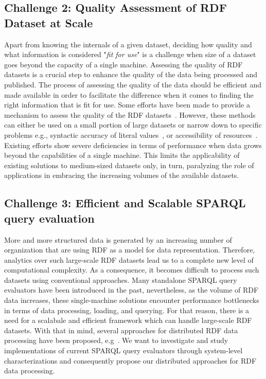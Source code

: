 \subsection{Challenge 2: Quality Assessment of RDF Dataset at Scale}
\label{sec:c2}
Apart from knowing the internals of a given dataset, deciding how quality and what information is considered "\textit{fit for use}" is a challenge when size of a dataset goes beyond the capacity of a single machine.
Assessing the quality of \gls{RDF} datasets is a crucial step to enhance the quality of the data being processed and published.
The process of assessing the quality of the data should be efficient and made available in order to facilitate the difference when it comes to finding the right information that is fit for use.
Some efforts have been made to provide a mechanism to assess the quality of the \gls{RDF} datasets~\cite{Debattista0AC18,farber2018,beek2018,debattista2016luzzu}.
However, these methods can either be used on a small portion of large datasets \cite{farber2018} or narrow down to specific problems e.g., syntactic accuracy of literal values~\cite{beek2018}, or accessibility of resources~\cite{Mihindukulasooriya2016LDSA}.
Existing efforts show severe deficiencies in terms of performance when data grows beyond the capabilities of a single machine.
This limits the applicability of existing solutions to medium-sized datasets only, in turn, paralyzing the role of applications in embracing the increasing volumes of the available datasets.

\subsection{Challenge 3: Efficient and Scalable SPARQL query evaluation}
\label{sec:c3}
More and more structured data is generated by an increasing number of organization that are using \gls{RDF} as a model for data representation.
Therefore, analytics over such large-scale \gls{RDF} datasets lead us to a complete new level of computational complexity.
As a consequence, it becomes difficult to process such datasets using conventional approaches.
Many standalone \gls{SPARQL} query evaluators have been introduced in the past, nevertheless, as the volume of \gls{RDF} data increases, these single-machine solutions encounter performance bottlenecks in terms of data processing, loading, and querying.
For that reason, there is a need for a scalabale and efficient framework which can handle large-scale \gls{RDF} datasets.
With that in mind, several approaches for distributed \gls{RDF} data processing have been proposed, e.g~\cite{sparqlgx-iswc-2016, Schatzle:2016:SRQ:2977797.2977806}.
We want to investigate and study implementations of current \gls{SPARQL} query evaluators through system-level characterizations and consequently propose our distributed approaches for RDF data processing.


